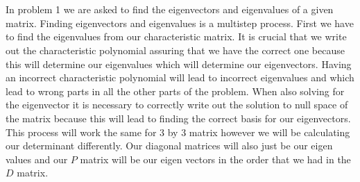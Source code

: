 \documentclass[12pt]{article}
\begin{document}
\\\\
In problem 1 we are asked to find the eigenvectors and eigenvalues of a given matrix. Finding eigenvectors and eigenvalues is a multistep process. First we have to find the eigenvalues from our characteristic matrix. It is crucial that we write out the characteristic polynomial assuring that we have the correct one because this will determine our eigenvalues which will determine our eigenvectors. Having an incorrect characteristic polynomial will lead to incorrect eigenvalues and which lead to wrong parts in all the other parts of the problem. When also solving for the eigenvector it is necessary to correctly write out the solution to null space of the matrix because this will lead to finding the correct basis for our eigenvectors. This process will work the same for 3 by 3 matrix however we will be calculating our determinant differently. Our diagonal matrices will also just be our eigen values and our $P$ matrix will be our eigen vectors in the order that we had in the $D$ matrix.
\end{document}

